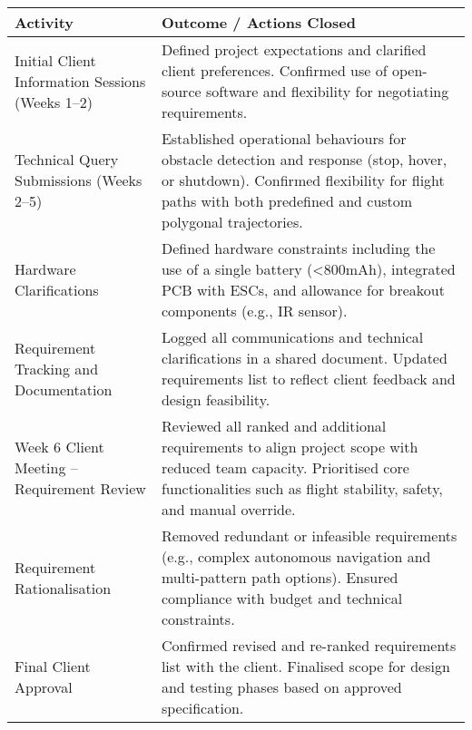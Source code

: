 \begin{tabular}{|p{4cm}|p{11.5cm}|}
\hline
\rowcolor{gray!15}
\textbf{Activity} & \textbf{Outcome / Actions Closed} \\
\hline
Initial Client Information Sessions (Weeks 1–2) & Defined project expectations and clarified client preferences. Confirmed use of open-source software and flexibility for negotiating requirements. \\ \hline
Technical Query Submissions (Weeks 2–5) & Established operational behaviours for obstacle detection and response (stop, hover, or shutdown). Confirmed flexibility for flight paths with both predefined and custom polygonal trajectories. \\ \hline
Hardware Clarifications & Defined hardware constraints including the use of a single battery (<800mAh), integrated PCB with ESCs, and allowance for breakout components (e.g., IR sensor). \\ \hline
Requirement Tracking and Documentation & Logged all communications and technical clarifications in a shared document. Updated requirements list to reflect client feedback and design feasibility. \\ \hline
Week 6 Client Meeting – Requirement Review & Reviewed all ranked and additional requirements to align project scope with reduced team capacity. Prioritised core functionalities such as flight stability, safety, and manual override. \\ \hline
Requirement Rationalisation & Removed redundant or infeasible requirements (e.g., complex autonomous navigation and multi-pattern path options). Ensured compliance with budget and technical constraints. \\ \hline
Final Client Approval & Confirmed revised and re-ranked requirements list with the client. Finalised scope for design and testing phases based on approved specification. \\ \hline
\end{tabular}